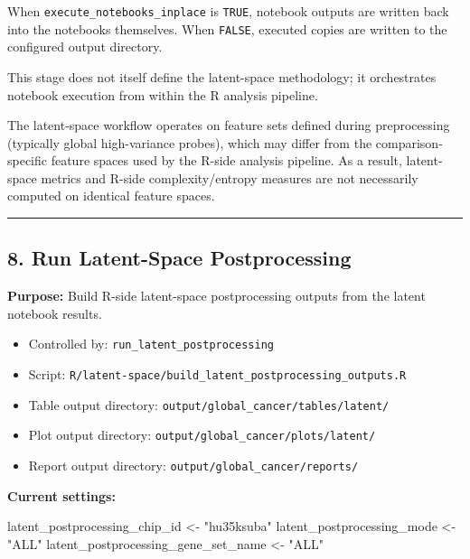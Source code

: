 \documentclass[
  letterpaper,
  DIV=11,
  numbers=noendperiod,
  openany,
  oneside]{scrreprt}
\newenvironment{Shaded}{\begin{snugshade}}{\end{snugshade}}
\newcommand{\NormalTok}[1]{\textcolor[rgb]{0.00,0.23,0.31}{#1}}
\newcommand{\OtherTok}[1]{\textcolor[rgb]{0.00,0.23,0.31}{#1}}
\newcommand{\StringTok}[1]{\textcolor[rgb]{0.13,0.47,0.30}{#1}}
\providecommand{\tightlist}{%
  \setlength{\itemsep}{0pt}\setlength{\parskip}{0pt}}
\begin{document}
When \texttt{execute\_notebooks\_inplace} is \texttt{TRUE}, notebook
outputs are written back into the notebooks themselves. When
\texttt{FALSE}, executed copies are written to the configured output
directory.

This stage does not itself define the latent-space methodology; it
orchestrates notebook execution from within the R analysis pipeline.

The latent-space workflow operates on feature sets defined during
preprocessing (typically global high-variance probes), which may differ
from the comparison-specific feature spaces used by the R-side analysis
pipeline. As a result, latent-space metrics and R-side
complexity/entropy measures are not necessarily computed on identical
feature spaces.

\begin{center}\rule{0.5\linewidth}{0.5pt}\end{center}

\subsection*{8. Run Latent-Space
Postprocessing}\label{run-latent-space-postprocessing}

\textbf{Purpose:} Build R-side latent-space postprocessing outputs from
the latent notebook results.

\begin{itemize}
\tightlist
\item
  Controlled by: \texttt{run\_latent\_postprocessing}
\item
  Script:
  \texttt{R/latent-space/build\_latent\_postprocessing\_outputs.R}
\item
  Table output directory: \texttt{output/global\_cancer/tables/latent/}
\item
  Plot output directory: \texttt{output/global\_cancer/plots/latent/}
\item
  Report output directory: \texttt{output/global\_cancer/reports/}
\end{itemize}

\textbf{Current settings:}

\begin{Shaded}
\begin{Highlighting}[]
\NormalTok{latent\_postprocessing\_chip\_id       }\OtherTok{\textless{}{-}} \StringTok{"hu35ksuba"}
\NormalTok{latent\_postprocessing\_mode          }\OtherTok{\textless{}{-}} \StringTok{"ALL"}
\NormalTok{latent\_postprocessing\_gene\_set\_name }\OtherTok{\textless{}{-}} \StringTok{"ALL"}
\end{Highlighting}
\end{Shaded}
\end{document}
